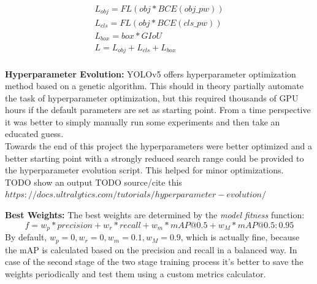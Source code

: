 \begin{equation}
  \begin{array}{l}
    L_{obj} = FL(obj * BCE(obj\_pw)) \\
    L_{cls} = FL(obj * BCE(cls\_pw)) \\
    L_{box} = box * GIoU \\
    L = L_{obj} + L_{cls} + L_{box} \\
  \end{array}
\end{equation}



\textbf{Hyperparameter Evolution:}
YOLOv5 offers hyperparameter optimization method based on a genetic algorithm. This should in theory partially automate the task of hyperparameter optimization, but this required thousands of GPU hours if the default parameters are set as starting point. From a time perspective it was better to simply manually run some experiments and then take an educated guess. \\
Towards the end of this project the hyperparameters were better optimized and a better starting point with a  strongly reduced search range could be provided to the hyperparameter evolution script. This helped for minor optimizations. \\
TODO show an output
TODO source/cite this $https://docs.ultralytics.com/tutorials/hyperparameter-evolution/$

\textbf{Best Weights:}
The best weights are determined by the \textit{model fitness} function:
\begin{equation}
f = w_p * precision + w_r * recall + w_m * mAP@0.5 + w_M * mAP@0.5:0.95
\end{equation}
By default, $w_p=0, w_r=0, w_m=0.1, w_M=0.9$, which is actually fine, because the mAP is calculated based on the precision and recall in a balanced way. In case of the second stage of the two stage training process it's better to save the weights periodically and test them using a custom metrics calculator. \\


